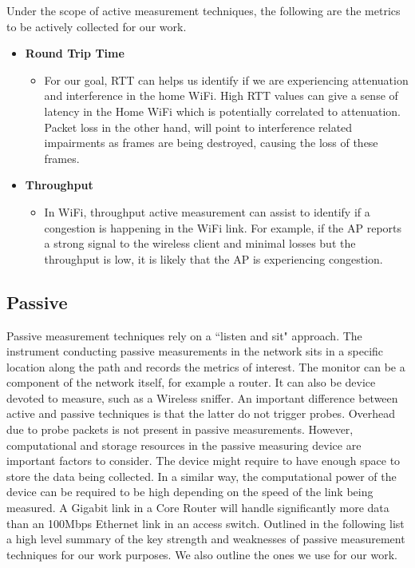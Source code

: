 Under the scope of active measurement techniques, the following are the metrics to be actively collected for our work.

\begin{itemize}
	\item \textbf{Round Trip Time}
	\begin{itemize}
		\item For our goal, RTT can helps us identify if we are experiencing attenuation and interference in the home WiFi. High RTT values can give a sense of latency in the Home WiFi which is potentially correlated to attenuation. Packet loss in the other hand, will point to interference related impairments as frames are being destroyed, causing the loss of these frames.
	\end{itemize}
	
	\item \textbf{Throughput}
	\begin{itemize}
		\item In WiFi, throughput active measurement can assist to identify if a congestion is happening in the WiFi link. For example, if the AP reports a strong signal to the wireless client and minimal losses but the throughput is low, it is likely that the AP is experiencing congestion.
	\end{itemize}
\end{itemize}

\subsection{Passive}

Passive measurement techniques rely on a ``listen and sit" approach. The instrument conducting passive measurements in the network sits in a specific location along the path and records the metrics of interest. The monitor can be a component of the network itself, for example a router. It can also be device devoted to measure, such as a Wireless sniffer. An important difference between active and passive techniques is that the latter do not trigger probes. Overhead due to probe packets is not present in passive measurements. However, computational and storage resources in the passive measuring device are important factors to consider. The device might require to have enough space to store the data being collected. In a similar way, the computational power of the device can be required to be high depending on the speed of the link being measured. A Gigabit link in a Core Router will handle significantly more data than an 100Mbps Ethernet link in an access switch. 
Outlined in the following list a high level summary of the key strength and weaknesses of passive measurement techniques for our work purposes. We also outline the ones we use for our work.

